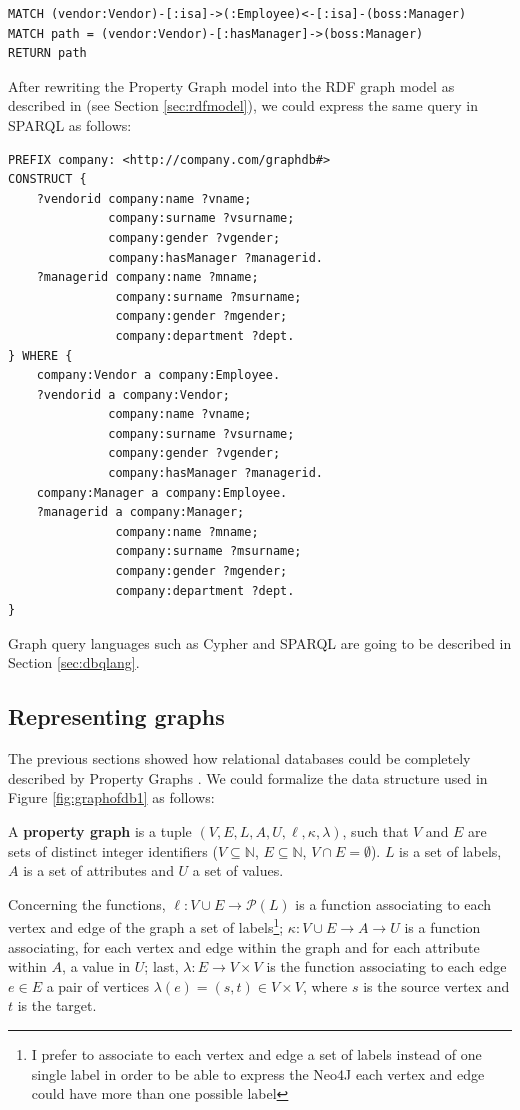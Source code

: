 \begin{lstlisting}[language=Cypher]
MATCH (vendor:Vendor)-[:isa]->(:Employee)<-[:isa]-(boss:Manager)
MATCH path = (vendor:Vendor)-[:hasManager]->(boss:Manager)
RETURN path
\end{lstlisting}

After rewriting the Property Graph model into the RDF graph model as described in \cite{DasSPCB14} (see Section \vref{sec:rdfmodel}), we could express the same query in SPARQL as follows:

\begin{lstlisting}[language=SPARQL,mathescape=true]
PREFIX company: <http://company.com/graphdb#>
CONSTRUCT { 
	?vendorid company:name ?vname;
	          company:surname ?vsurname;
	          company:gender ?vgender;
	          company:hasManager ?managerid.
	?managerid company:name ?mname;
	           company:surname ?msurname;
	           company:gender ?mgender;
	           company:department ?dept.
} WHERE {
    company:Vendor a company:Employee.
    ?vendorid a company:Vendor;
	          company:name ?vname;
	          company:surname ?vsurname;
	          company:gender ?vgender;
	          company:hasManager ?managerid.
    company:Manager a company:Employee.
    ?managerid a company:Manager;
	           company:name ?mname;
	           company:surname ?msurname;
	           company:gender ?mgender;
	           company:department ?dept.
}
\end{lstlisting}

Graph query languages such as Cypher and SPARQL are going to be described in Section \vref{sec:dbqlang}.

\subsection{Representing graphs}
The previous sections showed how relational databases could be completely described by Property Graphs \cite{Neo4jAlg}.  We could formalize the data structure used in Figure \ref{fig:graphofdb1} as follows:

\begin{definition}\label{def:propg10}
A \textbf{property graph} is a tuple $(V,E,L,A,U,\ell,\kappa,\lambda)$, such that $V$ and $E$ are sets of distinct integer identifiers ($V\subseteq \mathbb{N}$, $E\subseteq \mathbb{N}$, $V\cap E=\emptyset$). $L$ is a set of labels, $A$ is a set of attributes and $U$ a set of values.

Concerning the functions, $\ell\colon V\cup E\to \mathcal{P}(L)$ is a function associating to each vertex and edge of the graph a set of labels\footnote{I prefer to associate to each vertex and edge a set of labels instead of one single label in order to be able to express the Neo4J \cite{Neo4jMan,Neo4jAlg} each vertex and edge could have more than one possible label}; $\kappa\colon V\cup E\to A\to U$   is a function associating, for each vertex and edge within the graph and for each attribute within $A$, a value in $U$; last, $\lambda\colon E\to V\times V$ is the function associating to each edge $e\in E$ a pair of vertices $\lambda(e)=(s,t)\in V\times V$, where $s$ is the source vertex and $t$ is the target. 
\end{definition}

